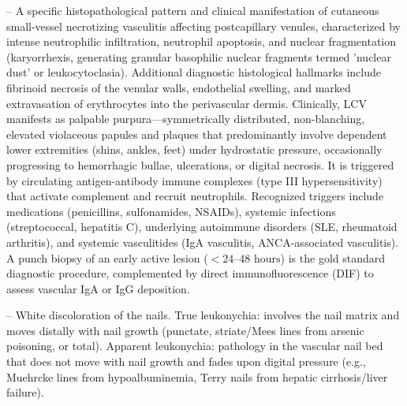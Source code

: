 -- A specific histopathological pattern and clinical manifestation of cutaneous small-vessel necrotizing vasculitis affecting postcapillary venules, characterized by intense neutrophilic infiltration, neutrophil apoptosis, and nuclear fragmentation (karyorrhexis, generating granular basophilic nuclear fragments termed 'nuclear dust' or leukocytoclasia). Additional diagnostic histological hallmarks include fibrinoid necrosis of the venular walls, endothelial swelling, and marked extravasation of erythrocytes into the perivascular dermis. Clinically, LCV manifests as palpable purpura---symmetrically distributed, non-blanching, elevated violaceous papules and plaques that predominantly involve dependent lower extremities (shins, ankles, feet) under hydrostatic pressure, occasionally progressing to hemorrhagic bullae, ulcerations, or digital necrosis. It is triggered by circulating antigen-antibody immune complexes (type III hypersensitivity) that activate complement and recruit neutrophils. Recognized triggers include medications (penicillins, sulfonamides, NSAIDs), systemic infections (streptococcal, hepatitis C), underlying autoimmune disorders (SLE, rheumatoid arthritis), and systemic vasculitides (IgA vasculitis, ANCA-associated vasculitis). A punch biopsy of an early active lesion ($<24\text{--}48\text{ hours}$) is the gold standard diagnostic procedure, complemented by direct immunofluorescence (DIF) to assess vascular IgA or IgG deposition.

-- White discoloration of the nails. True leukonychia: involves the nail matrix and moves distally with nail growth (punctate, striate/Mees lines from arsenic poisoning, or total). Apparent leukonychia: pathology in the vascular nail bed that does not move with nail growth and fades upon digital pressure (e.g., Muehrcke lines from hypoalbuminemia, Terry nails from hepatic cirrhosis/liver failure).

